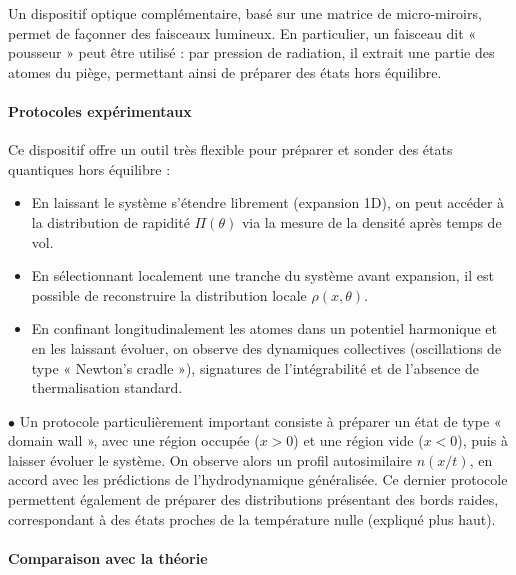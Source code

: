 Un dispositif optique complémentaire, basé sur une matrice de micro-miroirs,
permet de façonner des faisceaux lumineux. En particulier, un faisceau dit «
pousseur » peut être utilisé : par pression de radiation, il extrait une partie
des atomes du piège, permettant ainsi de préparer des états hors équilibre.

\medskip

\paragraph{Protocoles expérimentaux}

Ce dispositif offre un outil très flexible pour préparer et sonder des états
quantiques hors équilibre :

\begin{itemize}
    \item En laissant le système s’étendre librement (expansion 1D), on peut accéder à la
          distribution de rapidité $\Pi(\theta)$ via la mesure de la densité après temps
          de vol.

    \item En sélectionnant localement une tranche du système avant expansion, il est
          possible de reconstruire la distribution locale $\rho(x,\theta)$.

    \item En confinant longitudinalement les atomes dans un potentiel harmonique et en
          les laissant évoluer, on observe des dynamiques collectives (oscillations de
          type « Newton’s cradle »), signatures de l’intégrabilité et de l’absence de
          thermalisation standard.
\end{itemize}

\smallskip

$\bullet$ Un protocole particulièrement important consiste à préparer un état de type «
domain wall », avec une région occupée ($x>0$) et une région vide ($x<0$), puis
à laisser évoluer le système. On observe alors un profil autosimilaire
$n(x/t)$, en accord avec les prédictions de l’hydrodynamique généralisée.
Ce dernier protocole permettent également de préparer des distributions présentant
des bords raides, correspondant à des états proches de la température nulle (expliqué plus haut).

\vspace{-0.5cm}
\paragraph{Comparaison avec la théorie}

